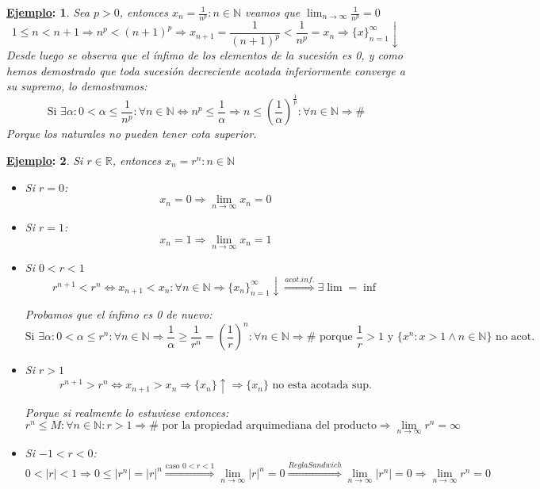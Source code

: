 \documentclass[10pt,a4paper,openright]{book}
\theoremstyle{break}
\newtheorem*{ej}{\underline{Ejemplo}:}
\begin{document}
\begin{ej}
Sea $p>0$, entonces $x_n=\frac{1}{n^p}: n\in \mathbb N$ veamos que $\lim_{n\rightarrow \infty} \frac{1}{n^p}=0$
$$1\leq n<n+1\Rightarrow n^p< (n+1)^p\Rightarrow x_{n+1}=\frac{1}{(n+1)^p}<\frac{1}{n^p}=x_n\Rightarrow \{x\}_{n=1}^\infty \downarrow$$
Desde luego se observa que el ínfimo de los elementos de la sucesión es 0, y como hemos demostrado que toda sucesión decreciente acotada inferiormente converge a su supremo, lo demostramos:
$$\mbox{Si }\exists \alpha: 0<\alpha\leq \frac{1}{n^p}: \forall n\in \mathbb N\Leftrightarrow n^p\leq \frac{1}{\alpha}\Rightarrow n\leq \left(\frac{1}{\alpha}\right)^{\frac{1}{p}}: \forall n \in \mathbb N\Rightarrow \#$$
Porque los naturales no pueden tener cota superior.
\end{ej}

\begin{ej}
Si $r\in \mathbb R$, entonces $x_n=r^n: n\in \mathbb N$
\begin{itemize}
\item Si $r=0$:
$$x_n=0\Rightarrow \lim_{n\rightarrow \infty}x_n=0$$

\item Si $r=1$:
$$x_n=1\Rightarrow \lim_{n\rightarrow \infty}x_n=1$$

\item Si $0<r<1$
$$r^{n+1}<r^n\Leftrightarrow x_{n+1}<x_n: \forall n\in \mathbb N\Rightarrow \{x_n\}_{n=1}^\infty \downarrow \stackrel{acot. inf.}\Rightarrow \exists \lim =\inf$$

Probamos que el ínfimo es 0 de nuevo:
$$\mbox{Si }\exists\alpha: 0<\alpha \leq r^n: \forall n\in \mathbb N\Rightarrow \frac{1}{\alpha}\geq\frac{1}{r^n}=\left(\frac{1}{r}\right)^n:\forall n\in \mathbb N\Rightarrow \# \mbox{ porque }\frac{1}{r}>1 \mbox{ y }\{x^n: x>1\wedge n\in \mathbb N\}\mbox{ no acot.}$$

\item Si $r>1$
$$r^{n+1}>r^n\Leftrightarrow x_{n+1}>x_n\Rightarrow \{x_n\}\uparrow \Rightarrow \{x_n\}\mbox{ no esta acotada sup.}$$

Porque si realmente lo estuviese entonces:
$$r^n\leq M: \forall n\in \mathbb N: r>1\Rightarrow \#\mbox{ por la propiedad arquimediana del producto}\Rightarrow \lim_{n\rightarrow\infty} r^n=\infty$$

\item Si $-1<r<0$:
$$0<|r|<1\Rightarrow 0\leq |r^n|=|r|^n\stackrel{\mbox{caso } 0<r<1}{\Rightarrow }\lim_{n\rightarrow \infty} |r|^n=0\stackrel{Regla Sandwich}{\Rightarrow} \lim_{n\rightarrow \infty} |r^n|=0\Rightarrow \lim_{n\rightarrow \infty} r^n=0$$


\end{itemize}
\end{ej}
\end{document}

